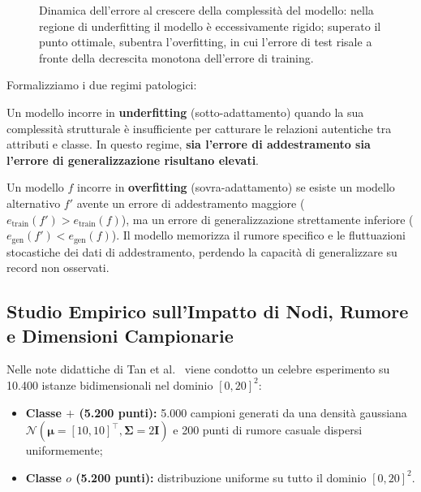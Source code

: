 \begin{figure}[H]
{%
}
\caption{Dinamica dell'errore al crescere della complessità del modello: nella regione di underfitting il modello è eccessivamente rigido; superato il punto ottimale, subentra l'overfitting, in cui l'errore di test risale a fronte della decrescita monotona dell'errore di training.}
\label{fig:dm-overfitting-learning-curve}
\end{figure}

Formalizziamo i due regimi patologici:
\begin{definition}[Underfitting]
Un modello incorre in \textbf{underfitting} (sotto-adattamento) quando la sua complessità strutturale è insufficiente per catturare le relazioni autentiche tra attributi e classe. In questo regime, \textbf{sia l'errore di addestramento sia l'errore di generalizzazione risultano elevati}.
\end{definition}

\begin{definition}[Overfitting]
Un modello $f$ incorre in \textbf{overfitting} (sovra-adattamento) se esiste un modello alternativo $f'$ avente un errore di addestramento maggiore ($e_{\text{train}}(f') > e_{\text{train}}(f)$), ma un errore di generalizzazione strettamente inferiore ($e_{\text{gen}}(f') < e_{\text{gen}}(f)$). Il modello memorizza il rumore specifico e le fluttuazioni stocastiche dei dati di addestramento, perdendo la capacità di generalizzare su record non osservati.
\end{definition}

\FloatBarrier
\subsection{Studio Empirico sull'Impatto di Nodi, Rumore e Dimensioni Campionarie}
\label{subsec:dm-empirical-overfitting}

Nelle note didattiche di Tan et al.~\cite{tan2018} viene condotto un celebre esperimento su 10.400 istanze bidimensionali nel dominio $[0, 20]^2$:
\begin{itemize}
    \item \textbf{Classe $+$ (5.200 punti):} 5.000 campioni generati da una densità gaussiana $\mathcal{N}(\boldsymbol{\mu}=[10, 10]^\top, \boldsymbol{\Sigma}=2\mathbf{I})$ e 200 punti di rumore casuale dispersi uniformemente;
    \item \textbf{Classe $o$ (5.200 punti):} distribuzione uniforme su tutto il dominio $[0, 20]^2$.
\end{itemize}

